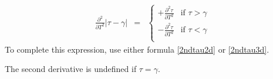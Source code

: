 \documentclass{report}
\begin{document}
\begin{eqnarray}
\frac{\partial^2}{\partial T^2} |\tau-\gamma| & = & \left\{ \begin{array}{cc} 
+\frac{\partial^2 \tau}{\partial T^2} & \mbox{if $\tau>\gamma$} \\
-\frac{\partial^2 \tau}{\partial T^2} & \mbox{if $\tau<\gamma$} \\
\end{array} \right.
\end{eqnarray}
To complete this expression, use either formula 
\ref{2ndtau2d} or \ref{2ndtau3d}. \newline

\noindent The second derivative is undefined if $\tau=\gamma$. \newline

% 
% 
% 
% 
% 
\end{document}

